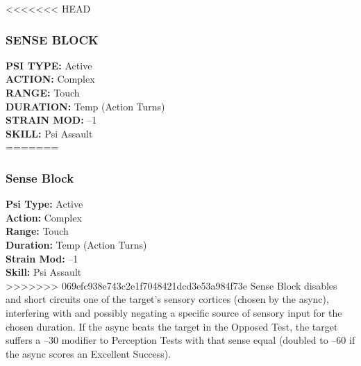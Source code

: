<<<<<<< HEAD \subsubsection{SENSE BLOCK} \textbf{PSI TYPE:} Active \\ \textbf{ACTION:} Complex \\ \textbf{RANGE:} Touch \\ \textbf{DURATION:} Temp (Action Turns) \\ \textbf{STRAIN MOD:} –1 \\ \textbf{SKILL:} Psi Assault \\ ======= \subsubsection{Sense Block} \textbf{Psi Type:} Active \\ \textbf{Action:} Complex \\ \textbf{Range:} Touch \\ \textbf{Duration:} Temp (Action Turns) \\ \textbf{Strain Mod:} –1 \\ \textbf{Skill:} Psi Assault \\ >>>>>>> 069efc938e743c2e1f7048421dcd3e53a984f73e Sense Block disables and short circuits one of the target’s sensory cortices (chosen by the async), interfering with and possibly negating a specific source of sensory input for the chosen duration. If the async beats the target in the Opposed Test, the target suffers a –30 modifier to Perception Tests with that sense equal (doubled to –60 if the async scores an Excellent Success). 




